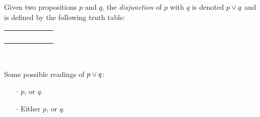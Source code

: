 \begin{definition}[Disjunction]
    \begin{center}
        \begin{minipage}[t]{.55\linewidth}
            Given two propositions $p$ and $q$, the \emph{disjunction} of $p$ with $q$
            is denoted $p \vee q$ and is defined by the following truth table:
            \begin{table}[H]
                \centering
                \label{tab:or}
                \begin{tabular}{|CcCc||Cc|}
                    \hline
                     &  &  \\ \hline
                    \thead{$\top$} & \thead{$\top$} &  \\
                    \thead{$\top$} & \thead{$\bot$} &  \\
                    \thead{$\bot$} & \thead{$\top$} &  \\
                    \thead{$\bot$} & \thead{$\bot$} &  \\ \hline
                \end{tabular}
            \end{table}
        \end{minipage}%
        \begin{minipage}[t]{.05\linewidth}
            ~
        \end{minipage}%
        \begin{minipage}[t]{.4\linewidth}
            Some possible readings of $p \vee q$:\\
            \begin{itemize}
                \item[$\cdot$]
                    $p$, or $q$.
                \item[$\cdot$]
                    Either $p$, or $q$.
            \end{itemize}
        \end{minipage}
    \end{center}
\end{definition}

